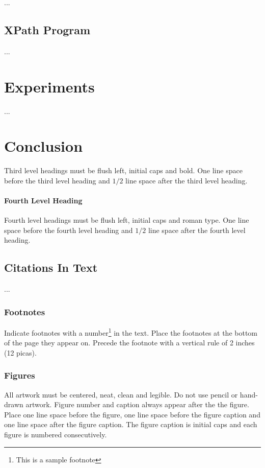 \documentclass[a4paper]{article}
\begin{document}
...

\subsection{XPath Program }

...

\section{Experiments }

...

\section{Conclusion }

Third level headings must be flush left, initial caps and bold.
One line space before the third level heading and $1/2$ line
space after the third level heading.

\paragraph{Fourth Level Heading}

Fourth level headings must be flush left, initial caps and roman type.
One line space before the fourth level heading and $1/2$ line
space after the fourth level heading.

\subsection{Citations In Text}

...

\subsubsection{Footnotes}

Indicate footnotes with a number\footnote{This is a sample footnote} in
the text. Place the footnotes at the bottom of the page they appear on.
Precede the footnote with a vertical rule of 2 inches (12 picas).

\subsubsection{Figures}

All artwork must be centered, neat, clean and legible. Do not use pencil
or hand-drawn artwork. Figure number and caption always appear after the
the figure. Place one line space before the figure, one line space
before the figure caption and one line space after the figure caption.
The figure caption is initial caps and each figure is numbered
consecutively.
\end{document}

